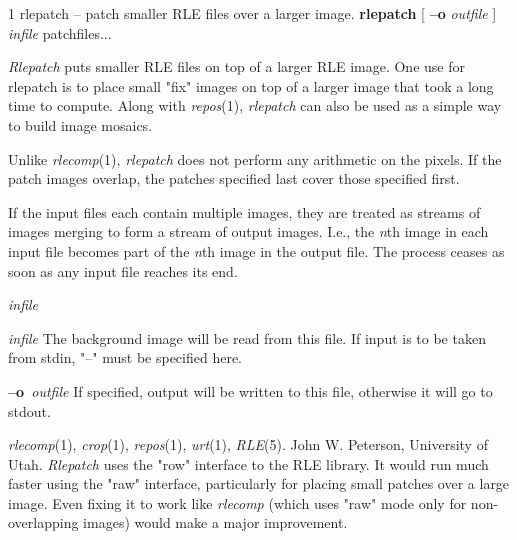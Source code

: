 \newpage


%
%
%
 1
rlepatch -- patch smaller RLE files over a larger image.
{\bf rlepatch}
[
{\bf --o} 
{\it outfile}
]
{\it infile} patchfiles...

{\it Rlepatch} 
puts smaller RLE files on top of a larger RLE image.  One use
for rlepatch is to place small "fix" images on top of a larger image that
took a long time to compute.  Along with 
{\it repos}{\rm (1),}
{\it rlepatch}
can also be used as a simple way to build image mosaics.  

Unlike 
{\it rlecomp}{\rm (1),}
{\it rlepatch}
does not perform any arithmetic on the pixels.
If the patch images overlap, the patches specified last cover those 
specified first.

If the input files each contain multiple images, they are treated as
streams of images merging to form a stream of output images.  I.e.,
the 
{\it n}{\rm th}
image in each input file becomes part of the
{\it n}{\rm th}
image in the output file.  The process ceases as soon as any input
file reaches its end.
\begin{TPlist}{{\it infile}}
\item[{{\it infile}}]
The background image will be read from this file. 
If input is to be taken from
stdin, "--" must be specified here.
\item[{{\bf --o}{\it \ outfile}
}]
If specified, output will be written to this file, otherwise it will
go to stdout.
\end{TPlist}
{\it rlecomp}{\rm (1),}
{\it crop}{\rm (1),}
{\it repos}{\rm (1),}
{\it urt}{\rm (1),}
{\it RLE}{\rm (5).}
John W. Peterson, University of Utah.
{\it Rlepatch}
uses the "row" interface to the RLE library.  It would run
much faster using the "raw" interface, particularly for placing small
patches over a large image.   Even fixing it to work like
{\it rlecomp}
(which uses 
"raw" mode only for non-overlapping images) would make a major improvement.
\newpage


